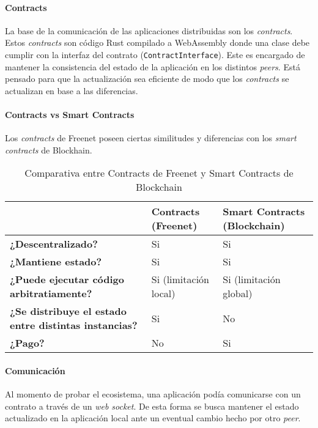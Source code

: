 \paragraph{Contracts}

La base de la comunicación de las aplicaciones distribuidas son los \textit{contracts}. Estos \textit{contracts} son código Rust compilado a WebAssembly donde una clase debe cumplir con la interfaz del contrato (\texttt{ContractInterface}). Este es encargado de mantener la consistencia del estado de la aplicación en los distintos \textit{peers}. Está pensado para que la actualización sea eficiente de modo que los \textit{contracts} se actualizan en base a las diferencias.

\paragraph{Contracts vs Smart Contracts}

Los \textit{contracts} de Freenet poseen ciertas similitudes y diferencias con los \textit{smart contracts} de Blockhain.

\setlength\tabcolsep{3pt}
\begin{table}[H]
    \centering
    \begin{tabular}{|m{21em}|m{10em}|m{10em}|}
        \hline
         & \textbf{Contracts (Freenet)} & \textbf{Smart Contracts (Blockchain)} \\
        \hline
        \textbf{¿Descentralizado?} & Si & Si \\
        \hline
        \textbf{¿Mantiene estado?} & Si & Si \\
        \hline
        \textbf{¿Puede ejecutar código arbitratiamente?} & Si (limitación local) & Si (limitación global) \\
        \hline
        \textbf{¿Se distribuye el estado entre distintas instancias?} & Si & No \\
        \hline
        \textbf{¿Pago?} & No & Si \\
        \hline
    \end{tabular}
    \caption{Comparativa entre Contracts de Freenet y Smart Contracts de Blockchain}
    \label{tab:contracts-vs-smart-contracts}
\end{table}

\paragraph{Comunicación}

Al momento de probar el ecosistema, una aplicación podía comunicarse con un contrato a través de un \textit{web socket}. De esta forma se busca mantener el estado actualizado en la aplicación local ante un eventual cambio hecho por otro \textit{peer}.

